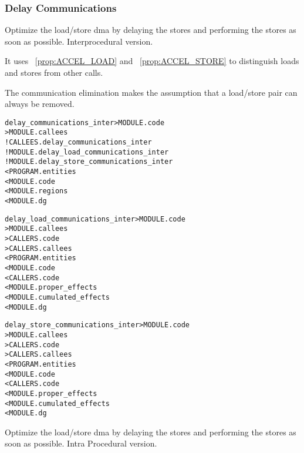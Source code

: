 \documentclass[a4paper]{report}
\newenvironment{PipsMake}{\begin{alltt}}{\end{alltt}}
\newcommand{\PipsPropRef}[1]{\texttt{\detokenize{#1}}~\ref{prop:#1}}
\newenvironment{PipsPass}[1]{\label{pass:#1}}{}
\begin{document}
\subsubsection{Delay Communications}
\begin{PipsPass}{delay_communications_inter}
Optimize the load/store dma by delaying the stores and
performing the stores as soon as possible. Interprocedural version.
\end{PipsPass}

It uses \PipsPropRef{ACCEL_LOAD} and \PipsPropRef{ACCEL_STORE}
to distinguish loads and stores from other calls.

The communication elimination makes the assumption that a load/store pair can always be removed.

\begin{PipsMake}
delay_communications_inter                    > MODULE.code
        > MODULE.callees
        ! CALLEES.delay_communications_inter
        ! MODULE.delay_load_communications_inter
        ! MODULE.delay_store_communications_inter
        < PROGRAM.entities
        < MODULE.code
        < MODULE.regions
        < MODULE.dg
\end{PipsMake}
\begin{PipsMake}
delay_load_communications_inter                    > MODULE.code
        > MODULE.callees
        > CALLERS.code
        > CALLERS.callees
        < PROGRAM.entities
        < MODULE.code
        < CALLERS.code
        < MODULE.proper_effects
        < MODULE.cumulated_effects
        < MODULE.dg
\end{PipsMake}
\begin{PipsMake}
delay_store_communications_inter                    > MODULE.code
        > MODULE.callees
        > CALLERS.code
        > CALLERS.callees
        < PROGRAM.entities
        < MODULE.code
        < CALLERS.code
        < MODULE.proper_effects
        < MODULE.cumulated_effects
        < MODULE.dg
\end{PipsMake}

\begin{PipsPass}{delay_communications_intra}
Optimize the load/store dma by delaying the stores and
performing the stores as soon as possible.
Intra Procedural version.
\end{PipsPass}
\end{document}
